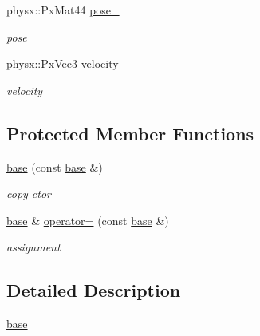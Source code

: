 \begin{DoxyCompactItemize}
physx::PxMat44 \hyperlink{classnebula_1_1content_1_1actor_1_1admin_1_1base_a414a98d747d9ad841eb16a4c0997d98c}{pose\_\-}
\begin{DoxyCompactList}\small\item\em pose \item\end{DoxyCompactList}\item 
physx::PxVec3 \hyperlink{classnebula_1_1content_1_1actor_1_1admin_1_1base_ab048afac3235aaa8f0946e8ece5eab55}{velocity\_\-}
\begin{DoxyCompactList}\small\item\em velocity \item\end{DoxyCompactList}\end{DoxyCompactItemize}
\subsection*{Protected Member Functions}
\begin{DoxyCompactItemize}
\item 
\hyperlink{classnebula_1_1content_1_1actor_1_1admin_1_1base_a81ae2f1aff51df4e46e030f53f116f05}{base} (const \hyperlink{classnebula_1_1content_1_1actor_1_1admin_1_1base}{base} \&)
\begin{DoxyCompactList}\small\item\em copy ctor \item\end{DoxyCompactList}\item 
\hyperlink{classnebula_1_1content_1_1actor_1_1admin_1_1base}{base} \& \hyperlink{classnebula_1_1content_1_1actor_1_1admin_1_1base_a96093c0d52eb68a36b3b80db30c2750c}{operator=} (const \hyperlink{classnebula_1_1content_1_1actor_1_1admin_1_1base}{base} \&)
\begin{DoxyCompactList}\small\item\em assignment \item\end{DoxyCompactList}\end{DoxyCompactItemize}


\subsection{Detailed Description}
\hyperlink{classnebula_1_1content_1_1actor_1_1admin_1_1base}{base} 

